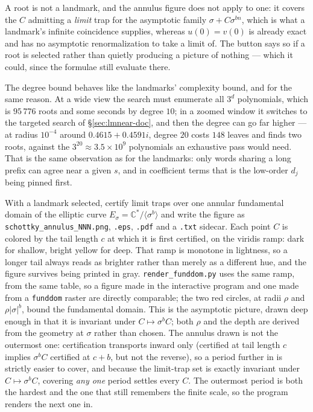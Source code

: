 \documentclass{amsart}
\begin{document}
\begin{description}
A root is not a landmark, and the annulus figure does not apply to one: it covers the $C$
admitting a \emph{limit} trap for the asymptotic family $\sigma + C\sigma^{bn}$, which is what
a landmark's infinite coincidence supplies, whereas $u(0) = v(0)$ is already exact and has no
asymptotic renormalization to take a limit of.  The button says so if a root is selected rather
than quietly producing a picture of nothing --- which it could, since the formulae still
evaluate there.

The degree bound behaves like the landmarks' complexity bound, and for the same reason.  At a
wide view the search must enumerate all $3^{d}$ polynomials, which is $95\,776$ roots and some
seconds by degree $10$; in a zoomed window it switches to the targeted search of
\S\ref{sec:lmnear-doc}, and then the degree can go far higher --- at radius $10^{-4}$ around
$0.4615 + 0.4591i$, degree $20$ costs $148$ leaves and finds two roots, against the
$3^{20} \approx 3.5\times 10^{9}$ polynomials an exhaustive pass would need.  That is the same
observation as for the landmarks: only words sharing a long prefix can agree near a given $s$,
and in coefficient terms that is the low-order $d_j$ being pinned first.
\item[Limit traps in annulus] With a landmark selected, certify limit traps over one annular
fundamental domain of the elliptic curve $E_\sigma = \mathbb{C}^*/\langle\sigma^b\rangle$ and
write the figure as \texttt{schottky\_annulus\_NNN.png}, \texttt{.eps}, \texttt{.pdf} and a
\texttt{.txt} sidecar.  Each point $C$ is colored by the tail length $c$ at which it is first certified, on the
viridis ramp: dark for shallow, bright yellow for deep.  That ramp is monotone in lightness,
so a longer tail always reads as brighter rather than merely as a different hue, and the
figure survives being printed in gray.  \texttt{render\_funddom.py} uses the same ramp, from
the same table, so a figure made in the interactive program and one made from a
\texttt{funddom} raster are directly comparable; the two red circles, at radii $\rho$ and $\rho|\sigma|^b$, bound the fundamental
domain.  This is the asymptotic picture, drawn deep enough in that it is invariant under
$C \mapsto \sigma^b C$; both $\rho$ and the depth are derived from the geometry at $\sigma$
rather than chosen.  The annulus drawn is not the outermost one: certification transports
inward only (certified at tail length $c$ implies $\sigma^b C$ certified at $c+b$, but not
the reverse), so a period further in is strictly easier to cover, and because the
limit-trap set is exactly invariant under $C \mapsto \sigma^b C$, covering \emph{any one}
period settles every $C$.  The outermost period is both the hardest and the one that still
remembers the finite scale, so the program renders the next one in.


\end{description}
\end{document}
